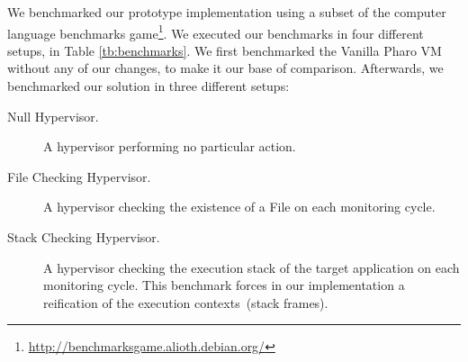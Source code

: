 We benchmarked our prototype implementation using a subset of the computer language benchmarks game\footnote{\url{http://benchmarksgame.alioth.debian.org/}}. We executed our benchmarks in four different setups, in Table \ref{tb:benchmarks}. We first benchmarked the Vanilla Pharo VM without any of our changes, to make it our base of comparison. Afterwards, we benchmarked our solution in three different setups:

\begin{description}
\item[Null Hypervisor.] A hypervisor performing no particular action.
\item[File Checking Hypervisor.] A hypervisor checking the existence of a File on each monitoring cycle.
\item[Stack Checking Hypervisor.] A hypervisor checking the execution stack of the target application on each monitoring cycle. This benchmark forces in our implementation a reification of the execution contexts~(stack frames).
\end{description}

